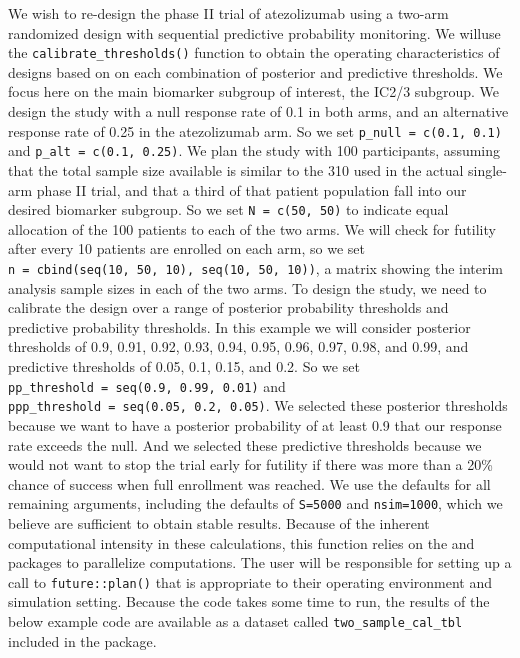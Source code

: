 We wish to re-design the phase II trial of atezolizumab using a two-arm
randomized design with sequential predictive probability monitoring. We
willuse the \texttt{calibrate\_thresholds()} function to obtain the
operating characteristics of designs based on on each combination of
posterior and predictive thresholds. We focus here on the main biomarker
subgroup of interest, the IC2/3 subgroup. We design the study with a
null response rate of 0.1 in both arms, and an alternative response rate
of 0.25 in the atezolizumab arm. So we set
\texttt{p\_null\ =\ c(0.1,\ 0.1)} and \texttt{p\_alt\ =\ c(0.1,\ 0.25)}.
We plan the study with 100 participants, assuming that the total sample
size available is similar to the 310 used in the actual single-arm phase
II trial, and that a third of that patient population fall into our
desired biomarker subgroup. So we set \texttt{N\ =\ c(50,\ 50)} to
indicate equal allocation of the 100 patients to each of the two arms.
We will check for futility after every 10 patients are enrolled on each
arm, so we set
\texttt{n\ =\ cbind(seq(10,\ 50,\ 10),\ seq(10,\ 50,\ 10))}, a matrix
showing the interim analysis sample sizes in each of the two arms. To
design the study, we need to calibrate the design over a range of
posterior probability thresholds and predictive probability thresholds.
In this example we will consider posterior thresholds of 0.9, 0.91,
0.92, 0.93, 0.94, 0.95, 0.96, 0.97, 0.98, and 0.99, and predictive
thresholds of 0.05, 0.1, 0.15, and 0.2. So we set
\texttt{pp\_threshold\ =\ seq(0.9,\ 0.99,\ 0.01)} and
\texttt{ppp\_threshold\ =\ seq(0.05,\ 0.2,\ 0.05)}. We selected these
posterior thresholds because we want to have a posterior probability of
at least 0.9 that our response rate exceeds the null. And we selected
these predictive thresholds because we would not want to stop the trial
early for futility if there was more than a 20\% chance of success when
full enrollment was reached. We use the defaults for all remaining
arguments, including the defaults of \texttt{S=5000} and
\texttt{nsim=1000}, which we believe are sufficient to obtain stable
results. Because of the inherent computational intensity in these
calculations, this function relies on the 
\citep{Bengtsson2020} and  \citep{Vaughan2021} packages
to parallelize computations. The user will be responsible for setting up
a call to \texttt{future::plan()} that is appropriate to their operating
environment and simulation setting. Because the code takes some time to
run, the results of the below example code are available as a dataset
called \texttt{two\_sample\_cal\_tbl} included in the 
package.

